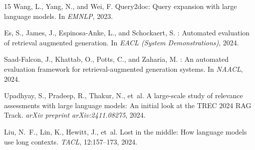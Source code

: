\documentclass[11pt,a4paper]{article}
\begin{document}
\begin{thebibliography}{15}
Wang, L., Yang, N., and Wei, F.
\newblock Query2doc: Query expansion with large language models.
\newblock In \emph{EMNLP}, 2023.

Es, S., James, J., Espinosa-Anke, L., and Schockaert, S.
: Automated evaluation of retrieval augmented
generation.
\newblock In \emph{EACL (System Demonstrations)}, 2024.

Saad-Falcon, J., Khattab, O., Potts, C., and Zaharia, M.
: An automated evaluation framework for
retrieval-augmented generation systems.
\newblock In \emph{NAACL}, 2024.

Upadhyay, S., Pradeep, R., Thakur, N., et~al.
\newblock A large-scale study of relevance assessments with large
language models: An initial look at the {TREC 2024 RAG Track}.
\newblock \emph{arXiv preprint arXiv:2411.08275}, 2024.

Liu, N.~F., Lin, K., Hewitt, J., et~al.
\newblock Lost in the middle: How language models use long contexts.
\newblock \emph{TACL}, 12:157--173, 2024.

\end{thebibliography}
\end{document}
